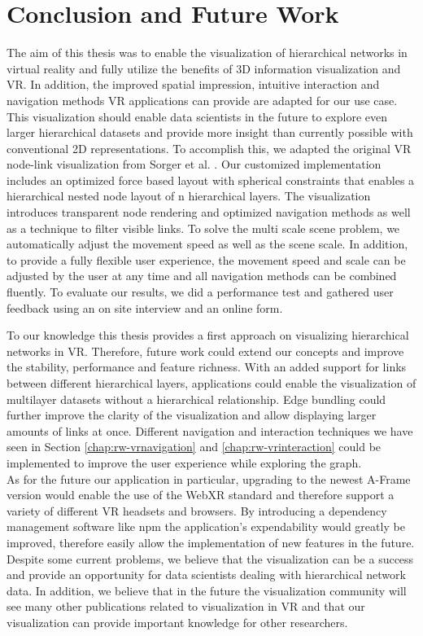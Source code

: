 \chapter{Conclusion and Future Work}
\label{chap:conclusion}

The aim of this thesis was to enable the visualization of hierarchical networks in virtual reality and fully utilize the benefits of 3D information visualization and VR. In addition, the improved spatial impression, intuitive interaction and navigation methods VR applications can provide are adapted for our use case. 
This visualization should enable data scientists in the future to explore even larger hierarchical datasets and provide more insight than currently possible with conventional 2D representations.
To accomplish this, we adapted the original VR node-link visualization from Sorger et al. \cite{sorger_immersive_2019}. 
Our customized implementation includes an optimized force based layout with spherical constraints that enables a hierarchical nested node layout of n hierarchical layers.
The visualization introduces transparent node rendering and optimized navigation methods as well as a technique to filter visible links. 
To solve the multi scale scene problem, we automatically adjust the movement speed as well as the scene scale.
In addition, to provide a fully flexible user experience, the movement speed and scale can be adjusted by the user at any time and all navigation methods can be combined fluently.
To evaluate our results, we did a performance test and gathered user feedback using an on site interview and an online form.

To our knowledge this thesis provides a first approach on visualizing hierarchical networks in VR. Therefore, future work could extend our concepts and improve the stability, performance and feature richness.
With an added support for links between different hierarchical layers, applications could enable the visualization of multilayer datasets without a hierarchical relationship. Edge bundling could further improve the clarity of the visualization and allow displaying larger amounts of links at once. Different navigation and interaction techniques we have seen in Section \ref{chap:rw-vrnavigation} and \ref{chap:rw-vrinteraction} could be implemented to improve the user experience while exploring the graph.\
\\
As for the future our application in particular, upgrading to the newest A-Frame version would enable the use of the WebXR standard and therefore support a variety of different VR headsets and browsers. By introducing a dependency management software like npm the application's expendability would greatly be improved, therefore easily allow the implementation of new features in the future.
\\
Despite some current problems, we believe that the visualization can be a success and provide an opportunity for data scientists dealing with hierarchical network data. In addition, we believe that in the future the visualization community will see many other publications related to visualization in VR and that our visualization can provide important knowledge for other researchers.